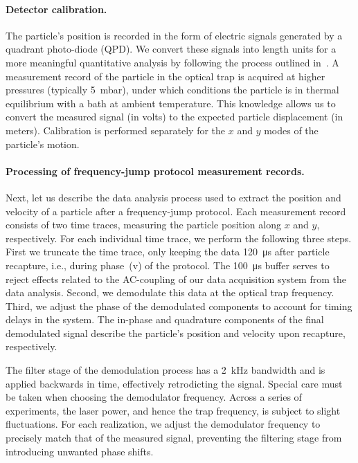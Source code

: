 \paragraph*{Detector calibration.}
The particle's position is recorded in the form of electric signals generated by a quadrant photo-diode (QPD). We convert these signals into length units for a more meaningful quantitative analysis by following the process outlined in~\cite{hauer2013general,hebestreit2018calibration}. A measurement record of the particle in the optical trap is acquired at higher pressures (typically \SI{5}{\milli\bar}), under which conditions the particle is in thermal equilibrium with a bath at ambient temperature. This knowledge allows us to convert the measured signal (in volts) to the expected particle displacement (in meters). Calibration is performed separately for the $x$ and $y$ modes of the particle's motion.

\paragraph*{Processing of frequency-jump protocol measurement records.}
Next, let us describe the data analysis process used to extract the position and velocity of a particle after a frequency-jump protocol.
Each measurement record consists of two time traces, measuring the particle position along $x$ and $y$, respectively.
For each individual time trace, we perform the following three steps. First we truncate the time trace, only keeping the data \SI{120}{\micro\second} after particle recapture, i.e., during phase~(v) of the protocol. The \SI{100}{\micro\second} buffer serves to reject effects related to the AC-coupling of our data acquisition system from the data analysis. Second, we demodulate this data at the optical trap frequency. Third, we adjust the phase of the demodulated components to account for timing delays in the system. The in-phase and quadrature components of the final demodulated signal describe the particle's position and velocity upon recapture, respectively.

The filter stage of the demodulation process has a \SI{2}{\kilo\hertz} bandwidth and is applied backwards in time, effectively retrodicting the signal. Special care must be taken when choosing the demodulator frequency. Across a series of experiments, the laser power, and hence the trap frequency, is subject to slight fluctuations. For each realization, we adjust the demodulator frequency to precisely match that of the measured signal, preventing the filtering stage from introducing unwanted phase shifts. 

